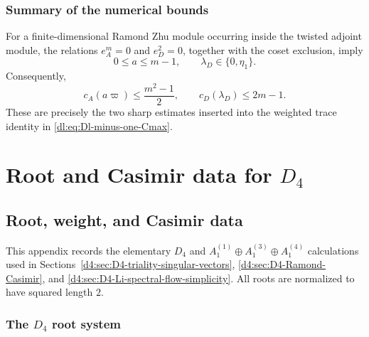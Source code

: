\documentclass[11pt,reqno]{amsart}
\theoremstyle{definition}
\theoremstyle{remark}
\begin{document}
\subsubsection{Summary of the numerical bounds}


For a finite-dimensional Ramond Zhu module occurring inside the
twisted adjoint module, the relations
\(e_A^m=0\) and \(e_D^2=0\), together with the coset exclusion, imply
\begin{equation*}
  0\le a\le m-1,
  \qquad
  \lambda_D\in\{0,\eta_1\}.
\end{equation*}
Consequently,
\begin{equation*}
  c_A(a\varpi)
  \le
  \frac{m^2-1}{2},
  \qquad
  c_D(\lambda_D)
  \le
  2m-1.
\end{equation*}
These are precisely the two sharp estimates inserted into the weighted
trace identity in
\eqref{dl:eq:Dl-minus-one-Cmax}.
\section{Root and Casimir data for \texorpdfstring{$D_4$}{D4}}


\subsection{Root, weight, and Casimir data}
\label{d4:app:D4-root-weight-Casimir-data}

This appendix records the elementary \(D_4\) and
\(A_1^{(1)}\oplus A_1^{(3)}\oplus A_1^{(4)}\) calculations used in
Sections~\ref{d4:sec:D4-triality-singular-vectors},
\ref{d4:sec:D4-Ramond-Casimir}, and
\ref{d4:sec:D4-Li-spectral-flow-simplicity}.  All roots are normalized to
have squared length \(2\).

\subsubsection{The \texorpdfstring{\(D_4\)}{D4} root system}
\end{document}
